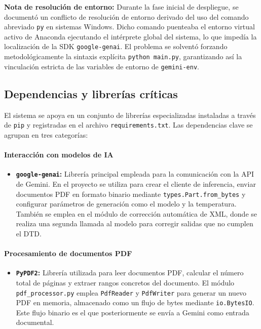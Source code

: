 \textbf{Nota de resolución de entorno:} Durante la fase inicial de despliegue, se documentó un conflicto de resolución de entorno derivado del uso del comando abreviado \texttt{py} en sistemas Windows. Dicho comando puenteaba el entorno virtual activo de Anaconda ejecutando el intérprete global del sistema, lo que impedía la localización de la SDK \texttt{google-genai}. El problema se solventó forzando metodológicamente la sintaxis explícita \texttt{python main.py}, garantizando así la vinculación estricta de las variables de entorno de \texttt{gemini-env}.

\subsection{Dependencias y librerías críticas}

El sistema se apoya en un conjunto de librerías especializadas instaladas a través de \texttt{pip} y registradas en el archivo \texttt{requirements.txt}. Las dependencias clave se agrupan en tres categorías:

\paragraph{Interacción con modelos de IA}

\begin{itemize}
    \item \textbf{\texttt{google-genai}:} Librería principal empleada para la comunicación con la API de Gemini. En el proyecto se utiliza para crear el cliente de inferencia, enviar documentos PDF en formato binario mediante \texttt{types.Part.from\_bytes} y configurar parámetros de generación como el modelo y la temperatura. También se emplea en el módulo de corrección automática de XML, donde se realiza una segunda llamada al modelo para corregir salidas que no cumplen el DTD.
\end{itemize}

\paragraph{Procesamiento de documentos PDF}

\begin{itemize}
    \item \textbf{\texttt{PyPDF2}:} Librería utilizada para leer documentos PDF, calcular el número total de páginas y extraer rangos concretos del documento. El módulo \texttt{pdf\_processor.py} emplea \texttt{PdfReader} y \texttt{PdfWriter} para generar un nuevo PDF en memoria, almacenado como un flujo de bytes mediante \texttt{io.BytesIO}. Este flujo binario es el que posteriormente se envía a Gemini como entrada documental.
\end{itemize}

